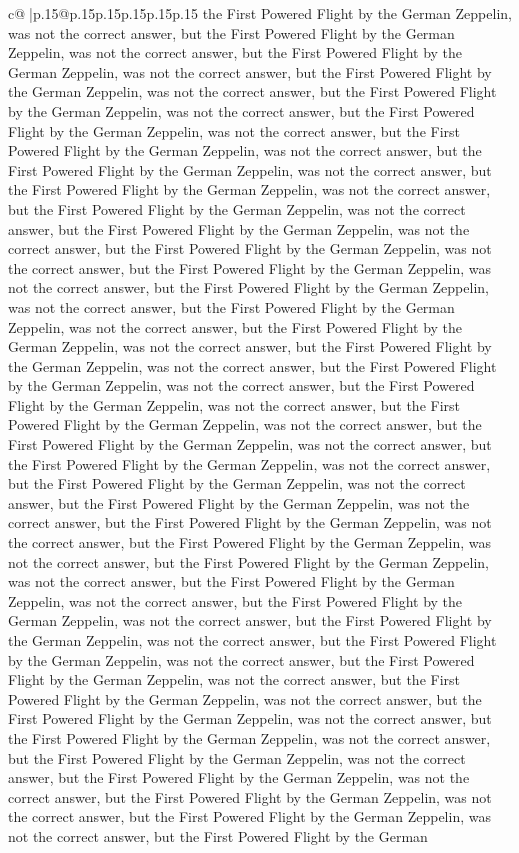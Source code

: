 \documentclass{article}
\begin{document}
{\begin{supertabular}{c@{$\;$}|p{.15\linewidth}@{}p{.15\linewidth}p{.15\linewidth}p{.15\linewidth}p{.15\linewidth}p{.15\linewidth}}
{{{the First Powered Flight by the German Zeppelin, was not the correct answer, but the First Powered Flight by the German Zeppelin, was not the correct answer, but the First Powered Flight by the German Zeppelin, was not the correct answer, but the First Powered Flight by the German Zeppelin, was not the correct answer, but the First Powered Flight by the German Zeppelin, was not the correct answer, but the First Powered Flight by the German Zeppelin, was not the correct answer, but the First Powered Flight by the German Zeppelin, was not the correct answer, but the First Powered Flight by the German Zeppelin, was not the correct answer, but the First Powered Flight by the German Zeppelin, was not the correct answer, but the First Powered Flight by the German Zeppelin, was not the correct answer, but the First Powered Flight by the German Zeppelin, was not the correct answer, but the First Powered Flight by the German Zeppelin, was not the correct answer, but the First Powered Flight by the German Zeppelin, was not the correct answer, but the First Powered Flight by the German Zeppelin, was not the correct answer, but the First Powered Flight by the German Zeppelin, was not the correct answer, but the First Powered Flight by the German Zeppelin, was not the correct answer, but the First Powered Flight by the German Zeppelin, was not the correct answer, but the First Powered Flight by the German Zeppelin, was not the correct answer, but the First Powered Flight by the German Zeppelin, was not the correct answer, but the First Powered Flight by the German Zeppelin, was not the correct answer, but the First Powered Flight by the German Zeppelin, was not the correct answer, but the First Powered Flight by the German Zeppelin, was not the correct answer, but the First Powered Flight by the German Zeppelin, was not the correct answer, but the First Powered Flight by the German Zeppelin, was not the correct answer, but the First Powered Flight by the German Zeppelin, was not the correct answer, but the First Powered Flight by the German Zeppelin, was not the correct answer, but the First Powered Flight by the German Zeppelin, was not the correct answer, but the First Powered Flight by the German Zeppelin, was not the correct answer, but the First Powered Flight by the German Zeppelin, was not the correct answer, but the First Powered Flight by the German Zeppelin, was not the correct answer, but the First Powered Flight by the German Zeppelin, was not the correct answer, but the First Powered Flight by the German Zeppelin, was not the correct answer, but the First Powered Flight by the German Zeppelin, was not the correct answer, but the First Powered Flight by the German Zeppelin, was not the correct answer, but the First Powered Flight by the German Zeppelin, was not the correct answer, but the First Powered Flight by the German Zeppelin, was not the correct answer, but the First Powered Flight by the German Zeppelin, was not the correct answer, but the First Powered Flight by the German Zeppelin, was not the correct answer, but the First Powered Flight by the German Zeppelin, was not the correct answer, but the First Powered Flight by the German }}}
\end{supertabular}}
\end{document}
